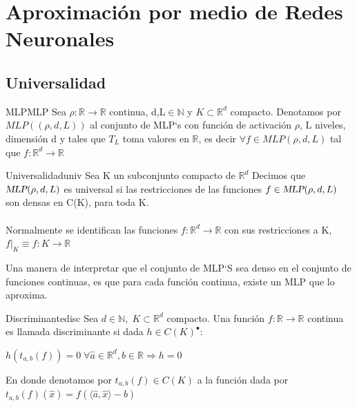 \documentclass[12pt,a4paper]{book}
\providecommand{\inp}[1]{\langle#1\rangle}
\providecommand{\mlp}[1]{\textsl{MLP}(\rho,d,#1)}
\begin{document}
\chapter{Aproximación por medio de Redes Neuronales}
\section{Universalidad}
\begin{definicion}{MLP}{MLP}
Sea $\rho:\mathbb{R}\rightarrow\mathbb{R}$ continua, d,L$\in\mathbb{N}$ y $K\subset\mathbb{R}^{d}$ compacto. Denotamos por $MLP((\rho,d,L))$ al conjunto de MLP`s con función de activación $\rho$, L niveles, dimensión d y tales que $T_{L}$ toma valores en $\mathbb{R}$, es decir $\forall f\in MLP(\rho,d,L)$ tal que $f:\mathbb{R}^{d}\rightarrow\mathbb{R}$ 
\end{definicion}
\smallskip

\begin{definicion}{Universalidad}{univ}
Sea K un subconjunto compacto de $\mathbb{R}^{d}$ Decimos que $\mlp{L}$ es universal si las restricciones de las funciones $f\in\mlp{L}$  son densas en C(K), para toda K.\\
\\
Normalmente se identifican las funciones $f:\mathbb{R}^{d}\rightarrow \mathbb{R}$ con sus restricciones a K, $f|_{K}\equiv f:K\rightarrow\mathbb{R}$ 
\end{definicion}
\smallskip

Una manera de interpretar que el conjunto de MLP`S sea denso en el conjunto de funciones continuas, es que para cada función continua, existe un MLP que lo aproxima.
\smallskip

\begin{definicion}{Discriminante}{disc}
Sea $d\in\mathbb{N},\;K\subset\mathbb{R}^{d}$ compacto. Una función $f:\mathbb{R}\rightarrow\mathbb{R}$ continua es llamada discriminante si dada $h\in C(K)^{\bullet}$:
\begin{center}
$h(t_{a,b}(f))=0\;\forall \widehat{a}\in\mathbb{R}^{d},b\in\mathbb{R}\Rightarrow h=0$
\end{center}
En donde denotamos por $t_{a,b}(f)\in C(K)$ a la función dada por $t_{a,b}(f)(\widehat{x})=f(\inp{\widehat{a},\widehat{x}}-b)$
\end{definicion}
\smallskip
\end{document}
